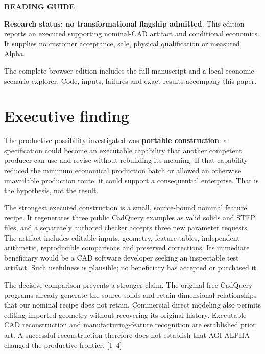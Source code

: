 \documentclass[11pt,letterpaper]{article}
\begin{document}
\color{AlphaInk}
\setcounter{page}{1}
{\sffamily\color{AlphaPurple}\large\bfseries READING GUIDE\par}
\vspace{8pt}
\colorbox{AlphaPale}{\parbox{\dimexpr\linewidth-2\fboxsep}{\vspace{8pt}\small\sffamily
\textbf{Research status: no transformational flagship admitted.} This edition reports an executed supporting nominal-CAD artifact and conditional economics. It supplies no customer acceptance, sale, physical qualification or measured Alpha.\vspace{8pt}}}
{\sffamily\small{}\tableofcontents}
\vfill
{\small\sffamily\color{AlphaMuted}The complete browser edition includes the full manuscript and a local economic-scenario explorer. Code, inputs, failures and exact results accompany this paper.}\par
\newpage

\hypertarget{executive-finding}{%
\section{Executive finding}\label{executive-finding}}

The productive possibility investigated was \textbf{portable construction}: a specification could become an executable capability that another competent producer can use and revise without rebuilding its meaning. If that capability reduced the minimum economical production batch or allowed an otherwise unavailable production route, it could support a consequential enterprise. That is the hypothesis, not the result.

The strongest executed construction is a small, source-bound nominal feature recipe. It regenerates three public CadQuery examples as valid solids and STEP files, and a separately authored checker accepts three new parameter requests. The artifact includes editable inputs, geometry, feature tables, independent arithmetic, reproducible comparisons and preserved corrections. Its immediate beneficiary would be a CAD software developer seeking an inspectable test artifact. Such usefulness is plausible; no beneficiary has accepted or purchased it.

The decisive comparison prevents a stronger claim. The original free CadQuery programs already generate the source solids and retain dimensional relationships that our nominal recipe does not retain. Commercial direct modeling also permits editing imported geometry without recovering its original history. Executable CAD reconstruction and manufacturing-feature recognition are established prior art. A successful reconstruction therefore does not establish that AGI ALPHA changed the productive frontier. {[}1--4{]}
\end{document}
